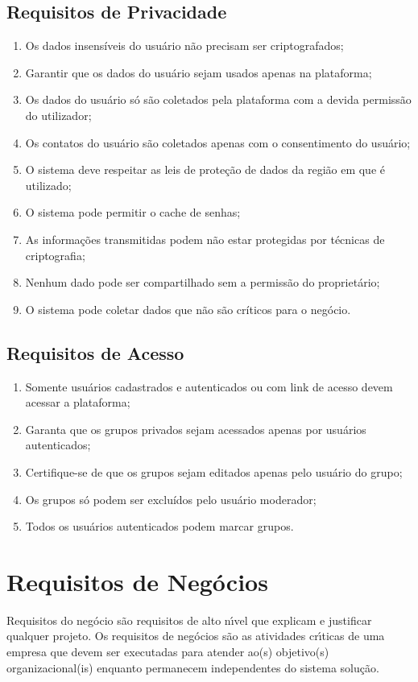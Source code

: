 \subsection{Requisitos de Privacidade }
\begin{enumerate}
  \item Os dados insensíveis do usuário não precisam ser criptografados;
  \item Garantir que os dados do usuário sejam usados apenas na plataforma;
  \item Os dados do usuário só são coletados pela plataforma com a devida permissão do utilizador;
  \item Os contatos do usuário são coletados apenas com o consentimento do usuário;
  \item O sistema deve respeitar as leis de proteção de dados da região em que é utilizado;
  \item O sistema pode permitir o cache de senhas;
  \item As informações transmitidas podem não estar protegidas por técnicas de criptografia;
  \item Nenhum dado pode ser compartilhado sem a permissão do proprietário;
  \item O sistema pode coletar dados que não são críticos para o negócio.
\end{enumerate}


\subsection{Requisitos de Acesso }
\begin{enumerate}
  \item Somente usuários cadastrados e autenticados ou com link de acesso devem acessar a plataforma;
  \item Garanta que os grupos privados sejam acessados apenas por usuários autenticados;
  \item Certifique-se de que os grupos sejam editados apenas pelo usuário do grupo;
  \item Os grupos só podem ser excluídos pelo usuário moderador;
  \item Todos os usuários autenticados podem marcar grupos.
\end{enumerate}


\section{Requisitos de Neg\'{o}cios}
Requisitos do neg\'{o}cio s\~{a}o requisitos de alto n\'{\i}vel que explicam e justificar qualquer projeto. Os requisitos de neg\'{o}cios s\~{a}o as atividades cr\'{\i}ticas de uma empresa que devem ser executadas para atender ao(s) objetivo(s) organizacional(is) enquanto permanecem independentes do sistema solu\c{c}\~{a}o.


